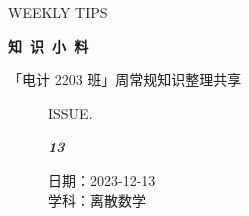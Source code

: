 \documentclass[UTF8]{ctexart}
\newcommand\Black[1]{\textcolor[gray]{0.3}{#1}}
\newcommand\Brown[1]{\textcolor[HTML]{998A4E}{#1}}
\newcommand\IssueNumber{13}
\newcommand\Date{2023-12-13}
\newcommand\Subject{离散数学}
\begin{document}
\BgThispage
\begin{center}
{\scriptsize\Issue \textcolor[HTML]{C8BA83}{WEEKLY TIPS}}

{\Huge\bfseries\TitleFont \Black{知\ 识\ 小\ 料}}

\vspace{-0.1cm}
{\footnotesize \Brown{「电计 2203 班」周常规知识整理共享}}
\end{center}

\vspace{-0.5cm}

\begin{figure}[H]
\hspace{1cm}
\begin{minipage}[t]{0.3\textwidth}
\centering
    \Brown{ISSUE.}

    \vspace{-0.6cm}
    \Huge \Issue\slshape\bfseries\Black{\IssueNumber}
\end{minipage}
\hfill
\begin{minipage}[t]{0.3\textwidth}
\centering
    \Brown{日期：\Date} \\
\vspace{-0.1cm}
    \Brown{学科：\Subject} \\
\end{minipage}
\hspace{0.8cm}
\end{figure}
\end{document}
